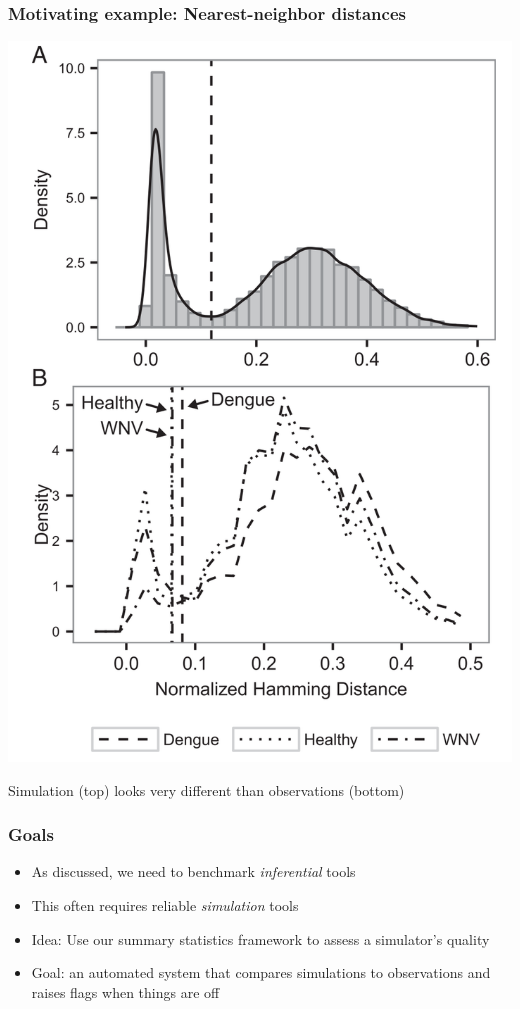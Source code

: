 \documentclass[mathserif,compress]{beamer}
\renewcommand\;{\,}
\begin{document}
\begin{frame}

\begin{center}\frametitle{Motivating example: Nearest-neighbor distances}
\includegraphics[width=0.4\linewidth]{Images/Dengue.png}
\end{center}
Simulation (top) looks very different than observations (bottom)
\end{frame}

\begin{frame}\frametitle{Goals}
\begin{itemize}
\item
As discussed, we need to benchmark \emph{inferential} tools
\bigskip
\item
This often requires reliable \emph{simulation} tools
\bigskip
\item
Idea: Use our summary statistics framework to assess a simulator's quality
\bigskip
\item
Goal: an automated system that compares simulations to observations and raises flags when things are off

\end{itemize}
\end{frame}
\end{document}
